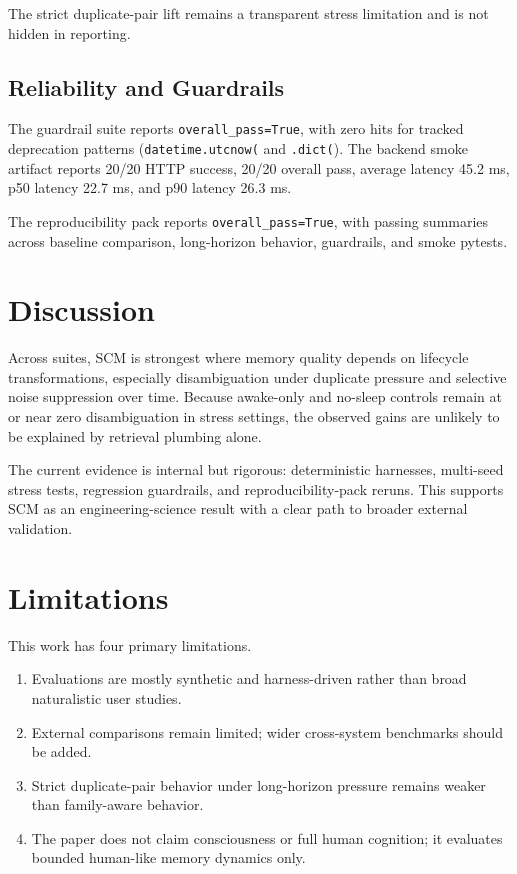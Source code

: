 \documentclass[11pt,a4paper]{article}
\begin{document}
The strict duplicate-pair lift remains a transparent stress limitation and is not hidden in reporting.

\subsection{Reliability and Guardrails}
The guardrail suite reports \texttt{overall\_pass=True}, with zero hits for tracked deprecation patterns (\texttt{datetime.utcnow(} and \texttt{.dict(}). The backend smoke artifact reports 20/20 HTTP success, 20/20 overall pass, average latency 45.2 ms, p50 latency 22.7 ms, and p90 latency 26.3 ms.

The reproducibility pack reports \texttt{overall\_pass=True}, with passing summaries across baseline comparison, long-horizon behavior, guardrails, and smoke pytests.

\section{Discussion}
Across suites, SCM is strongest where memory quality depends on lifecycle transformations, especially disambiguation under duplicate pressure and selective noise suppression over time. Because awake-only and no-sleep controls remain at or near zero disambiguation in stress settings, the observed gains are unlikely to be explained by retrieval plumbing alone.

The current evidence is internal but rigorous: deterministic harnesses, multi-seed stress tests, regression guardrails, and reproducibility-pack reruns. This supports SCM as an engineering-science result with a clear path to broader external validation.

\section{Limitations}
This work has four primary limitations.
\begin{enumerate}[leftmargin=1.5em]
    \item Evaluations are mostly synthetic and harness-driven rather than broad naturalistic user studies.
    \item External comparisons remain limited; wider cross-system benchmarks should be added.
    \item Strict duplicate-pair behavior under long-horizon pressure remains weaker than family-aware behavior.
    \item The paper does not claim consciousness or full human cognition; it evaluates bounded human-like memory dynamics only.
\end{enumerate}
\end{document}
